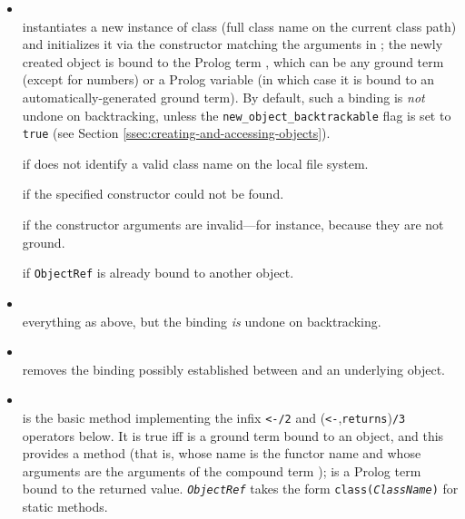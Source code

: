 \begin{itemize}

\item {}\\
    \noindent {} instantiates a new instance of class  (full class name on the current class path) and initializes it via the constructor matching the arguments in ; the newly created object is bound to the Prolog term , which can be any ground term (except for numbers) or a Prolog variable (in which case it is bound to an  automatically-generated ground term).
    By default, such a binding is \textit{not} undone on backtracking, unless the \texttt{new\_object\_backtrackable} flag is set to \texttt{true} (see Section \ref{ssec:creating-and-accessing-objects}).


     if  does not identify a valid class name on the local file system.

     if the specified constructor could not be found.

     if the constructor arguments are invalid---for instance, because they are not ground.

     if \texttt{ObjectRef} is already bound to another object.


\item {}\\
    everything as above, but the binding \textit{is} undone on backtracking.

\item {}\\
    \noindent{} removes the binding possibly established between  and an underlying object.


\item {}\\
    \noindent{} is the basic method implementing the infix \verb|<-/2| and (\verb|<-|,\texttt{returns})\texttt{/3} operators below. It is true iff  is a ground term bound to an object, and this provides a method  (that is, whose name is the functor name and whose arguments are the arguments of the compound term );  is a Prolog term bound to the returned value.
    \texttt{\textit{ObjectRef}} takes the form \texttt{class(\textit{ClassName})} %
    for static methods.


\end{itemize}
